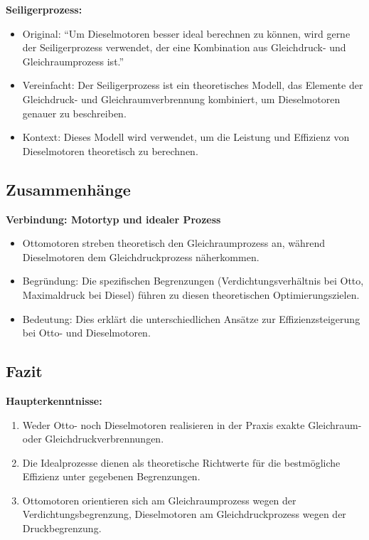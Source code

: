 \documentclass[a4paper,12pt]{article}
\begin{document}
\textbf{Seiligerprozess:}

\begin{itemize}
    \item Original: \enquote{Um Dieselmotoren besser ideal berechnen zu können, wird gerne der Seiligerprozess verwendet, der eine Kombination aus Gleichdruck- und Gleichraumprozess ist.}
    \item Vereinfacht: Der Seiligerprozess ist ein theoretisches Modell, das Elemente der Gleichdruck- und Gleichraumverbrennung kombiniert, um Dieselmotoren genauer zu beschreiben.
    \item Kontext: Dieses Modell wird verwendet, um die Leistung und Effizienz von Dieselmotoren theoretisch zu berechnen.
\end{itemize}

\subsection{Zusammenhänge}

\textbf{Verbindung: Motortyp und idealer Prozess}

\begin{itemize}
    \item Ottomotoren streben theoretisch den Gleichraumprozess an, während Dieselmotoren dem Gleichdruckprozess näherkommen.
    \item Begründung: Die spezifischen Begrenzungen (Verdichtungsverhältnis bei Otto, Maximaldruck bei Diesel) führen zu diesen theoretischen Optimierungszielen.
    \item Bedeutung: Dies erklärt die unterschiedlichen Ansätze zur Effizienzsteigerung bei Otto- und Dieselmotoren.
\end{itemize}

\subsection{Fazit}

\textbf{Haupterkenntnisse:}

\begin{enumerate}
    \item Weder Otto- noch Dieselmotoren realisieren in der Praxis exakte Gleichraum- oder Gleichdruckverbrennungen.
    \item Die Idealprozesse dienen als theoretische Richtwerte für die bestmögliche Effizienz unter gegebenen Begrenzungen.
    \item Ottomotoren orientieren sich am Gleichraumprozess wegen der Verdichtungsbegrenzung, Dieselmotoren am Gleichdruckprozess wegen der Druckbegrenzung.
\end{enumerate}
\end{document}
